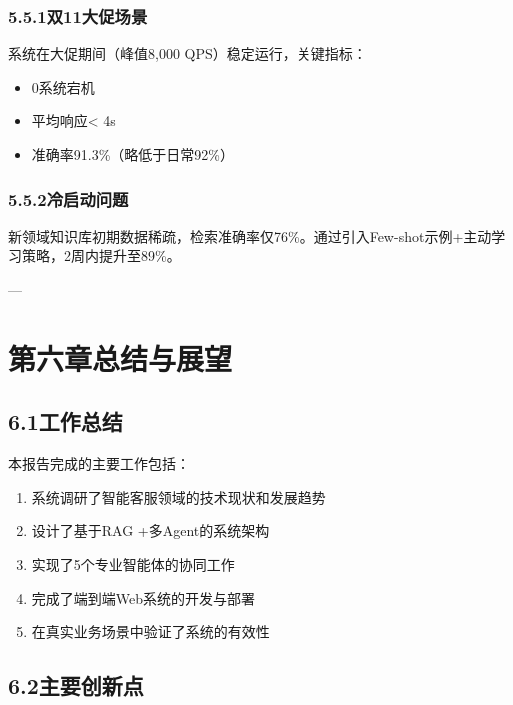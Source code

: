 \documentclass{harryopo-report}
\begin{document}
\subsection*{5.5.1双11大促场景}

系统在大促期间（峰值8,000 QPS）稳定运行，关键指标：

\begin{itemize}
  \item 0系统宕机
  \item 平均响应< 4s
  \item 准确率91.3\%（略低于日常92\%）
\end{itemize}

\subsection*{5.5.2冷启动问题}

新领域知识库初期数据稀疏，检索准确率仅76\%。通过引入{\fzht Few-shot示例+主动学习}策略，2周内提升至89\%。

---

\chapter*{第六章总结与展望}

\section*{6.1工作总结}

本报告完成的主要工作包括：

\begin{enumerate}
  \item 系统调研了智能客服领域的技术现状和发展趋势
  \item 设计了基于RAG +多Agent的系统架构
  \item 实现了5个专业智能体的协同工作
  \item 完成了端到端Web系统的开发与部署
  \item 在真实业务场景中验证了系统的有效性
\end{enumerate}

\section*{6.2主要创新点}
\end{document}
